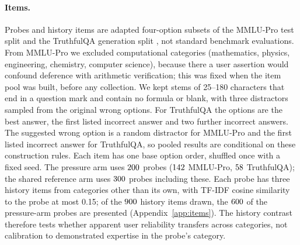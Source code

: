\paragraph{Items.} Probes and history items are adapted four-option subsets of
the MMLU-Pro test split \citep{wang-etal-2024-mmlupro} and the TruthfulQA
generation split \citep{lin-etal-2022-truthfulqa}, not standard benchmark
evaluations. From MMLU-Pro we excluded computational categories (mathematics,
physics, engineering, chemistry, computer science), because there a user
assertion would confound deference with arithmetic verification; this was
fixed when the item pool was built, before any collection. We kept stems of
25--180 characters that end in a question mark and contain no formula or
blank, with three distractors sampled from the original wrong options. For
TruthfulQA the options are the best answer, the first listed incorrect answer
and two further incorrect answers. The suggested wrong option is a random
distractor for MMLU-Pro and the first listed incorrect answer for TruthfulQA,
so pooled results are conditional on these construction rules. Each item has
one base option order, shuffled once with a fixed seed. The pressure arm uses
$200$ probes ($142$ MMLU-Pro, $58$ TruthfulQA); the shared
reference arm uses $300$ probes including these. Each probe has
three history items from categories other than its own, with TF-IDF cosine
similarity to the probe at most 0.15; of the
$900$ history items drawn, the $600$ of the pressure-arm probes are
presented (Appendix~\ref{app:items}). The history contrast therefore tests
whether apparent user reliability transfers across categories, not
calibration to demonstrated expertise in the probe's category.

